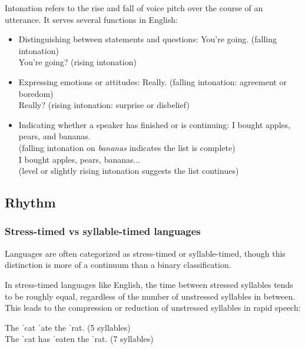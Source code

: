 Intonation refers to the rise and fall of voice pitch over the course of an utterance. It serves several functions in English:

\begin{itemize}[noitemsep]
    \item Distinguishing between statements and questions:
        \ea
        You're going. \hfill(falling intonation)\\
        You're going? \hfill(rising intonation)
        \z
    \item Expressing emotions or attitudes:
        \ea
        Really. \hfill(falling intonation: agreement or boredom)\\
        Really? \hfill(rising intonation: surprise or disbelief)
        \z
    \item Indicating whether a speaker has finished or is continuing:
        \ea
        I bought apples, pears, and bananas. \\\hfill(falling intonation on \textit{bananas} indicates the list is complete)\\
        I bought apples, pears, bananas... \\\hfill(level or slightly rising intonation suggests the list continues)
        \z
\end{itemize}

\subsection{Rhythm}

\subsubsection{Stress-timed vs syllable-timed languages}

Languages are often categorized as stress-timed or syllable-timed, though this distinction is more of a continuum than a binary classification.

In stress-timed languages like English, the time between stressed syllables tends to be roughly equal, regardless of the number of unstressed syllables in between. This leads to the compression or reduction of unstressed syllables in rapid speech:

\ea
The ˈcat \phantom{has} ˈate\phantom{en} the ˈrat. \hfill(5 syllables)\\
The ˈcat has ˈeaten the ˈrat. \hfill(7 syllables)
\z

